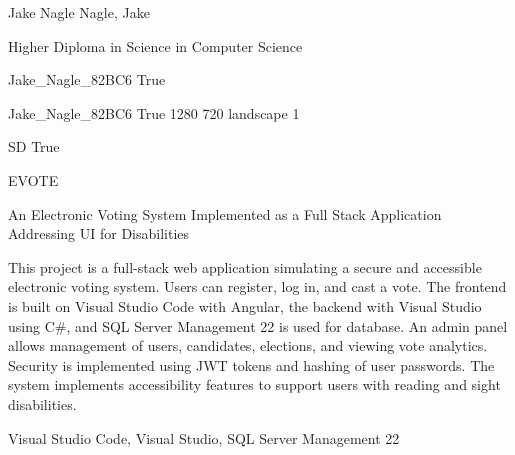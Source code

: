 
\begingroup{}\relax



\def\Key{Jake_Nagle_82BC6}

{Jake Nagle}
{Nagle, Jake}

{Higher Diploma in Science in Computer Science}

{Jake_Nagle_82BC6}
{True}

{Jake_Nagle_82BC6}
{True}
{1280}
{720}
{landscape}
{1}

{SD}
{True}

{EVOTE}

{An Electronic Voting System Implemented as a Full Stack Application Addressing UI for Disabilities}

{This project is a full-stack web application simulating a secure and accessible electronic voting system. Users can register, log in, and cast a vote. The frontend is built on Visual Studio Code with Angular, the backend with Visual Studio using C\#, and SQL Server Management 22 is used for database. An admin panel allows management of users, candidates, elections, and viewing vote analytics. Security is implemented using JWT tokens and hashing of user passwords. The system implements accessibility features to support users with reading and sight disabilities.}

{Visual Studio Code, Visual Studio, SQL Server Management 22}

